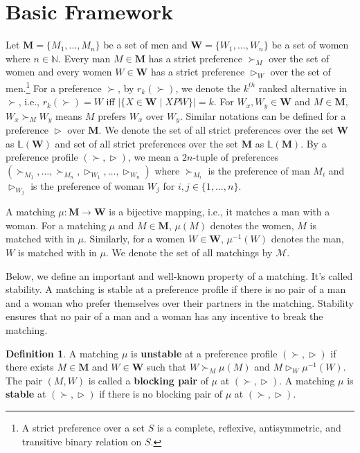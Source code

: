 \documentclass[a4paper,11pt,table]{article}
\newcommand{\rva}{\vartriangleright}
\theoremstyle{definition}
\newtheorem{definition}{Definition}[section]
\theoremstyle{remark}
\begin{document}
\section{Basic Framework}
Let $\pmb{M}=\{M_1,\ldots,M_n\}$ be a set of men and $\pmb{W}=\{W_1,\ldots,W_n\}$ be a set of women where $n\in \mathbb{N}$. Every man $M\in \pmb{M}$ has a strict preference $\succ_M$ over the set of women and every women $W\in \pmb{W}$ has a strict preference $\rva_W$ over the set of men.\footnote{A strict preference over a set $S$ is a complete, reflexive, antisymmetric, and transitive binary relation on $S$.} For a preference $\succ$, by $r_k(\succ)$, we denote the $k^{th}$ ranked alternative in $\succ$, i.e., $r_k(\succ)=W$ iff $|\{X\in \pmb{W}\mid XPW\}|=k$.  For $W_x,W_y\in \pmb{W}$ and $M\in \pmb{M}$, $W_x\succ_MW_y$ means $M$  prefers $W_x$ over $W_y$. Similar notations can be defined for a preference $\rva$ over $\pmb{M}$.   We denote the set of all strict preferences over the set $\pmb{W}$ as $\mathbb{L}(\pmb{W})$ and set of all strict preferences over the set $\pmb{M}$ as $\mathbb{L}(\pmb{M})$. By a preference profile $(\succ, \rva)$, we mean a $2n$-tuple of preferences $(\succ_{M_1},\ldots,\succ_{M_n}, \rva_{W_1},\ldots, \rva_{W_n})$ where $\succ_{M_i}$ is the preference of man $M_i$ and $\rva_{W_j}$ is the preference of woman $W_j$ for $i,j\in \{1,\ldots,n\}$. 

A matching $\mu:\pmb{M}\to \pmb{W}$ is a bijective mapping, i.e., it matches a man with a woman. For a matching $\mu$ and $M\in \pmb{M}$, $\mu(M)$ denotes the women, $M$ is matched with in $\mu$. Similarly, for a women $W\in \pmb{W}$, $\mu^{-1}(W)$ denotes the man, $W$ is matched with in $\mu$. We denote the set of all matchings by $\mathcal{M}$.

Below, we define an important and well-known property of a matching. It's called stability. A matching is stable at a preference profile if there is no pair of a man and a woman who prefer themselves over their partners in the matching. Stability ensures that no pair of a man and a woman has any incentive to break the matching. 
\begin{definition}
    A matching $\mu$ is \textbf{unstable} at a preference profile $(\succ, \rva)$ if there exists $M\in \pmb{M}$ and $W\in \pmb{W}$ such that $W\succ_M\mu(M)$ and $M\rva_W \mu^{-1}(W)$. The pair $(M,W)$ is called a \textbf{blocking pair} of $\mu$ at  $(\succ,\rva)$. A matching $\mu$ is \textbf{stable }at $(\succ,\rva)$ if there is no blocking pair of $\mu$ at  $(\succ,\rva)$.
\end{definition}
\end{document}
